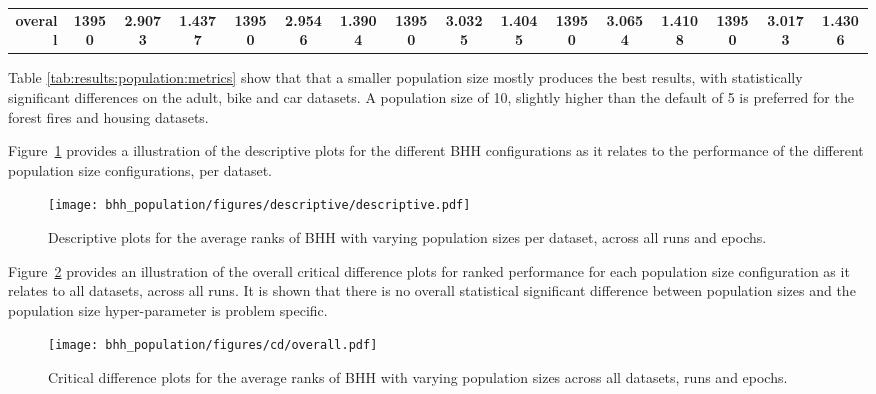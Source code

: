 \begin{table}[H]
{\begin{tabular}{rccccccccccccccc}
			\midrule
			\textbf{overall}                    & \textbf{13950}                          & \cellcolor[rgb]{ .776,  .937,  .808}\textcolor[rgb]{ 0,  .38,  0}{\textbf{2.9073}} & \textbf{1.4377} & \textbf{13950}                  & \textbf{2.9546}                                                           & \textbf{1.3904} & \textbf{13950}                  & \textbf{3.0325} & \textbf{1.4045} & \textbf{13950}                  & \textbf{3.0654}                                                           & \textbf{1.4108} & \textbf{13950}                  & \textbf{3.0173}                                                           & \textbf{1.4306} \\
		\end{tabular}%
	}
\end{table}%

Table \ref{tab:results:population:metrics} show that that a smaller population size mostly produces the best results, with statistically significant differences on the adult, bike and car datasets. A population size of 10, slightly higher than the default of 5 is preferred for the forest fires and housing datasets.

Figure~\ref{fig:results:population:descriptive:descriptive} provides a illustration of the descriptive plots for the different \acs{BHH} configurations as it relates to the performance of the different population size configurations, per dataset.

\begin{figure}[H]
	\centering
	\texttt{[image: bhh\_population/figures/descriptive/descriptive.pdf]}
	\caption{Descriptive plots for the average ranks of \acs{BHH} with varying population sizes per dataset, across all runs and epochs.}
	\label{fig:results:population:descriptive:descriptive}
\end{figure}

Figure~\ref{fig:results:population:descriptive:cd} provides an illustration of the overall critical difference plots for ranked performance for each population size configuration as it relates to all datasets, across all runs. It is shown that there is no overall statistical significant difference between population sizes and the population size hyper-parameter is problem specific.

\begin{figure}[H]
	\centering
	\texttt{[image: bhh\_population/figures/cd/overall.pdf]}
	\caption{Critical difference plots for the average ranks of \acs{BHH} with varying population sizes across all datasets, runs and epochs.}
	\label{fig:results:population:descriptive:cd}
\end{figure}


